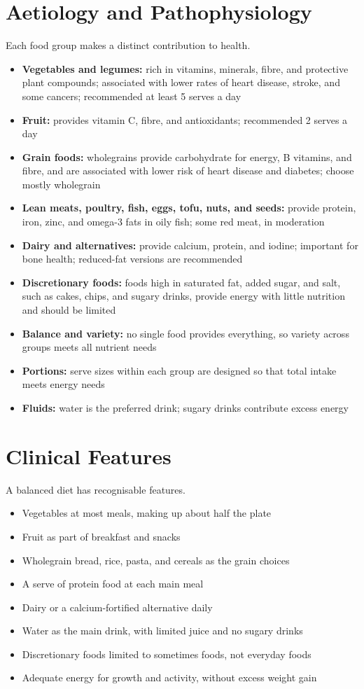 \section*{Aetiology and Pathophysiology}
Each food group makes a distinct contribution to health.
\begin{itemize}
    \item \textbf{Vegetables and legumes:} rich in vitamins, minerals, fibre, and protective plant compounds; associated with lower rates of heart disease, stroke, and some cancers; recommended at least 5 serves a day
    \item \textbf{Fruit:} provides vitamin C, fibre, and antioxidants; recommended 2 serves a day
    \item \textbf{Grain foods:} wholegrains provide carbohydrate for energy, B vitamins, and fibre, and are associated with lower risk of heart disease and diabetes; choose mostly wholegrain
    \item \textbf{Lean meats, poultry, fish, eggs, tofu, nuts, and seeds:} provide protein, iron, zinc, and omega-3 fats in oily fish; some red meat, in moderation
    \item \textbf{Dairy and alternatives:} provide calcium, protein, and iodine; important for bone health; reduced-fat versions are recommended
    \item \textbf{Discretionary foods:} foods high in saturated fat, added sugar, and salt, such as cakes, chips, and sugary drinks, provide energy with little nutrition and should be limited
    \item \textbf{Balance and variety:} no single food provides everything, so variety across groups meets all nutrient needs
    \item \textbf{Portions:} serve sizes within each group are designed so that total intake meets energy needs
    \item \textbf{Fluids:} water is the preferred drink; sugary drinks contribute excess energy
\end{itemize}

\section*{Clinical Features}
A balanced diet has recognisable features.
\begin{itemize}
    \item Vegetables at most meals, making up about half the plate
    \item Fruit as part of breakfast and snacks
    \item Wholegrain bread, rice, pasta, and cereals as the grain choices
    \item A serve of protein food at each main meal
    \item Dairy or a calcium-fortified alternative daily
    \item Water as the main drink, with limited juice and no sugary drinks
    \item Discretionary foods limited to sometimes foods, not everyday foods
    \item Adequate energy for growth and activity, without excess weight gain
\end{itemize}

